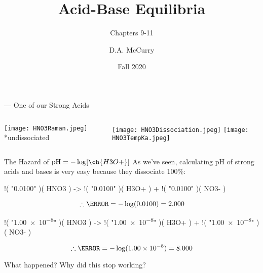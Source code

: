 \documentclass[notes=hide]{beamer}
\title{Acid-Base Equilibria}
\subtitle{Chapters 9-11}
\institute{CHEM321 --- Analytical Chemistry I \\ Bloomsburg University}
\author{D.A. McCurry}
\date{Fall 2020}
\begin{document}
\maketitle
{}


\begin{frame}{ --- One of our Strong Acids}
	\begin{columns}
		\begin{center}
			\texttt{[image: HNO3Raman.jpeg]}
			*undissociated 
		\end{center}
		\begin{center}
			\texttt{[image: HNO3Dissociation.jpeg]}
			\texttt{[image: HNO3TempKa.jpeg]}
		\end{center}
	\end{columns}
\end{frame}

\begin{frame}{The Hazard of $\text{pH} = -\log[\ch{H3O+}]$}
	As we've seen, calculating pH of strong acids and bases is very easy
	because they dissociate 100\%:
	\begin{reaction*}
		!( "\SI{0.0100}{\Molar}" )( HNO3 ) -> !( "\SI{0.0100}{\Molar}" )( H3O+ ) + !( "\SI{0.0100}{\Molar}" )( NO3- )
	\end{reaction*}
	\begin{equation*}
		\therefore \pH = -\log(0.0100) = 2.000
	\end{equation*}

	\pause

	\begin{reaction*}
		!( "\SI{1.00e-8}{\Molar}" )( HNO3 ) -> !( "\SI{1.00e-8}{\Molar}" )( H3O+ ) + !( "\SI{1.00e-8}{\Molar}" )( NO3- )
	\end{reaction*}
	\begin{equation*}
		\therefore \pH = -\log(\num{1.00e-8}) = 8.000
	\end{equation*}

	\pause

	What happened? Why did this stop working?
\end{frame}
\end{document}
